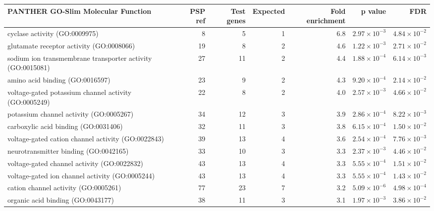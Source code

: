 \begin{table}[ht]
\centering
\begin{adjustbox}{width=\textwidth}

\begin{tabular}{lrrrrrr}
  \hline
PANTHER GO-Slim Molecular Function & PSP ref & Test genes & Expected & Fold enrichment & p value & FDR \\ 
  \hline
cyclase activity (GO:0009975) & 8 & 5 & 1 & 6.8 & $2.97 \times 10^{-3}$ & $4.84 \times 10^{-2}$ \\ 
  glutamate receptor activity (GO:0008066) & 19 & 8 & 2 & 4.6 & $1.22 \times 10^{-3}$ & $2.71 \times 10^{-2}$ \\ 
  sodium ion transmembrane transporter activity (GO:0015081) & 27 & 11 & 2 & 4.4 & $1.88 \times 10^{-4}$ & $6.14 \times 10^{-3}$ \\ 
  amino acid binding (GO:0016597) & 23 & 9 & 2 & 4.3 & $9.20 \times 10^{-4}$ & $2.14 \times 10^{-2}$ \\ 
  voltage-gated potassium channel activity (GO:0005249) & 22 & 8 & 2 & 4.0 & $2.57 \times 10^{-3}$ & $4.66 \times 10^{-2}$ \\ 
  potassium channel activity (GO:0005267) & 34 & 12 & 3 & 3.9 & $2.86 \times 10^{-4}$ & $8.22 \times 10^{-3}$ \\ 
  carboxylic acid binding (GO:0031406) & 32 & 11 & 3 & 3.8 & $6.15 \times 10^{-4}$ & $1.50 \times 10^{-2}$ \\ 
  voltage-gated cation channel activity (GO:0022843) & 39 & 13 & 4 & 3.6 & $2.54 \times 10^{-4}$ & $7.76 \times 10^{-3}$ \\ 
  neurotransmitter binding (GO:0042165) & 33 & 10 & 3 & 3.3 & $2.37 \times 10^{-3}$ & $4.46 \times 10^{-2}$ \\ 
  voltage-gated channel activity (GO:0022832) & 43 & 13 & 4 & 3.3 & $5.55 \times 10^{-4}$ & $1.51 \times 10^{-2}$ \\ 
  voltage-gated ion channel activity (GO:0005244) & 43 & 13 & 4 & 3.3 & $5.55 \times 10^{-4}$ & $1.43 \times 10^{-2}$ \\ 
  cation channel activity (GO:0005261) & 77 & 23 & 7 & 3.2 & $5.09 \times 10^{-6}$ & $4.98 \times 10^{-4}$ \\ 
  organic acid binding (GO:0043177) & 38 & 11 & 3 & 3.1 & $1.97 \times 10^{-3}$ & $3.86 \times 10^{-2}$ \\ 

\end{tabular}
\end{adjustbox}
\end{table}
